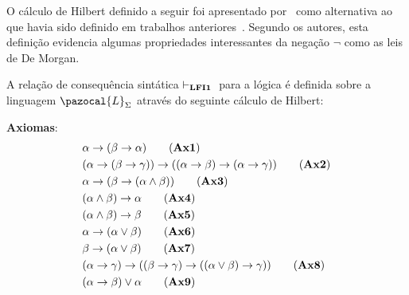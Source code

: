     O cálculo de Hilbert definido a seguir foi apresentado por~ como alternativa ao que havia sido definido em trabalhos anteriores~\cite{carnielli2000formal,carnielli2007}. Segundo os autores, esta definição evidencia algumas propriedades interessantes da negação $\neg$ como as leis de De Morgan.


    \begin{definicao}[\lfium{}]
        \label{def:lfi1}
        A relação de consequência sintática $\vdash_{\textbf{LFI1}{}}{}$ para a lógica \lfium{} é definida sobre a linguagem $\pazocal{L}_{\Sigma}$ através do seguinte cálculo de Hilbert:

        \noindent\textbf{Axiomas}:
        \begin{align*}
            & \alpha \rightarrow (\beta \rightarrow \alpha)\tag{\textbf{Ax1}}                                                                                     \\
            & (\alpha \rightarrow (\beta \rightarrow \gamma)) \rightarrow ((\alpha \rightarrow \beta) \rightarrow (\alpha \rightarrow \gamma ))\tag{\textbf{Ax2}} \\
            & \alpha \rightarrow (\beta \rightarrow (\alpha \land \beta))\tag{\textbf{Ax3}}                                                                       \\
            & (\alpha \land \beta) \rightarrow \alpha\tag{\textbf{Ax4}}                                                                                           \\
            & (\alpha \land \beta) \rightarrow \beta\tag{\textbf{Ax5}}                                                                                            \\
            & \alpha \rightarrow (\alpha \lor \beta)\tag{\textbf{Ax6}}                                                                                            \\
            & \beta \rightarrow (\alpha \lor \beta)\tag{\textbf{Ax7}}                                                                                             \\
            & (\alpha \rightarrow \gamma) \rightarrow ((\beta \rightarrow \gamma) \rightarrow ((\alpha \lor \beta) \rightarrow \gamma))\tag{\textbf{Ax8}}         \\
            & (\alpha \rightarrow \beta) \lor \alpha\tag{\textbf{Ax9}}                                                                                           \\

\end{align*}
\end{definicao}
